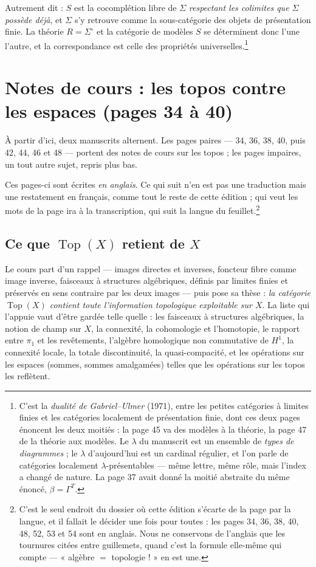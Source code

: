 \documentclass[11pt,a4paper]{article}
\begin{document}
Autrement dit : $S$ est la cocomplétion libre de $\Sigma$ \emph{respectant les
colimites que $\Sigma$ possède déjà}, et $\Sigma$ s'y retrouve comme la
sous-catégorie des objets de présentation finie. La théorie $R = \Sigma^{\circ}$
et la catégorie de modèles $S$ se déterminent donc l'une l'autre, et la
correspondance est celle des propriétés universelles.\footnote{C'est la
\emph{dualité de Gabriel--Ulmer} (1971), entre les petites catégories à limites
finies et les catégories localement de présentation finie, dont ces deux pages
énoncent les deux moitiés : la page 45 va des modèles à la théorie, la page 47
de la théorie aux modèles. Le $\lambda$ du manuscrit est un ensemble de
\emph{types de diagrammes} ; le $\lambda$ d'aujourd'hui est un cardinal
régulier, et l'on parle de catégories localement $\lambda$-présentables — même
lettre, même rôle, mais l'index a changé de nature. La page 37 avait
donné la moitié abstraite du même énoncé, $\beta = \Gamma^{T}$.}


\section*{Notes de cours : les topos contre les espaces (pages 34 à 40)}

À partir d'ici, deux manuscrits alternent. Les pages paires — 34, 36, 38, 40,
puis 42, 44, 46 et 48 — portent des notes de cours sur les
topos ; les pages impaires, un tout autre sujet, repris plus bas.

Ces pages-ci sont écrites \emph{en anglais}. Ce qui suit n'en est pas une
traduction mais une restatement en français, comme tout le reste de cette
édition ; qui veut les mots de la page ira à la transcription, qui suit la
langue du feuillet.\footnote{C'est le seul endroit du dossier où cette édition
s'écarte de la page par la langue, et il fallait le décider une fois pour
toutes : les pages 34, 36, 38, 40, 48, 52, 53 et 54 sont en anglais. Nous ne conservons de l'anglais que les tournures
citées entre guillemets, quand c'est la formule elle-même qui compte — « algèbre
$=$ topologie ! » en est une.}

\subsection*{Ce que $\operatorname{Top}(X)$ retient de $X$}

Le cours part d'un rappel — images directes et inverses, foncteur fibre comme
image inverse, faisceaux à structures algébriques, définis par limites finies
et préservés en sens contraire par les deux images — puis pose sa thèse :
\emph{la catégorie $\operatorname{Top}(X)$ contient toute l'information
topologique exploitable sur $X$}. La liste qui l'appuie vaut d'être gardée
telle quelle : les faisceaux à structures algébriques, la notion de champ sur
$X$, la connexité, la cohomologie et l'homotopie, le rapport entre $\pi_{1}$ et
les revêtements, l'algèbre homologique non commutative de $H^{1}$, la
connexité locale, la totale discontinuité, la quasi-compacité, et les
opérations sur les espaces (sommes, sommes amalgamées) telles que les
opérations sur les topos les reflètent.
\end{document}
